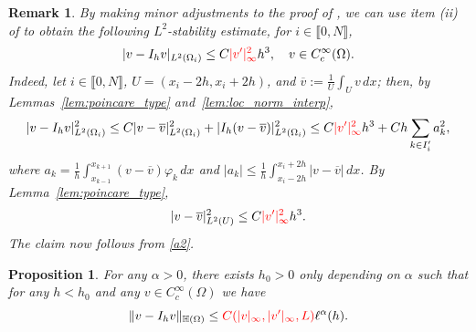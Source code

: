 \documentclass[10 pt]{article}
\newcommand\inter[1]{\llbracket #1\rrbracket}
\newtheorem{remark}[theorem]{Remark}
\newtheorem{proposition}[theorem]{Proposition}
\numberwithin{equation}{section}
\newcommand{\B}[1]{{\color{red} #1}}  %
\begin{document}
\begin{remark}\label{rem:l2_stability}
By making minor adjustments to the proof of  , we can use item (ii) of  to obtain the following $L^2$-stability estimate, for $i\in\inter{0,N}$,
%
\begin{equation*}
    |v-I_hv|_{L^2(\Omega_i)} \leq C\B{|v^\prime|^2_{\infty}} h^3, \quad  v\in C_c^\infty(\Omega).
\end{equation*}
Indeed, let $i\in\inter{0,N}$, $U=({x_i-2h},{x_{i}+2h})$, and $\overline{v}:=\frac{1}{U}\int_U v\, dx$; then, by Lemmas~\ref{lem:poincare_type} and~\ref{lem:loc_norm_interp},
\begin{align}
|v-I_hv|^2_{L^2(\Omega_i)}
\leq C|v-\overline{v}|_{L^2(\Omega_i)}^2 +|I_h(v-\overline{v})|^2_{L^2(\Omega_i)}
\leq C\B{|v^\prime|^2_{\infty}}h^3+Ch\sum_{k\in I_i^\prime}a_k^2,\label{a2}
\end{align}
where $a_k=\frac{1}{h}\int_{x_{k-1}}^{x_{k+1}} (v-\overline{v})\varphi_k\, dx$ and $|a_k|\leq \frac{1}{h}\int_{x_i-2h}^{x_{i}+2h}|v-\overline{v}|\, dx$. By Lemma~\ref{lem:poincare_type},
%
\begin{equation*}
    |v-\overline{v}|_{L^2(U)}^2\leq C\B{|v^\prime|^2_{\infty}}h^3.
\end{equation*}
%
The claim now follows from \eqref{a2}.
\end{remark}

\begin{proposition}\label{eq:estab_H_c_infty}
For any $\alpha>0$, there exists $h_0>0$ only depending on $\alpha$ such that for any $h<h_0$ and any $v\in C_c^\infty(\Omega)$ we have
%
\begin{equation}\label{eq:rate_H_c_infty}
    \|v-I_h v\|_{\mathbb H(\Omega)}\leq \B{C(|v|_{\infty},|v^\prime|_{\infty},L)}\ell^\alpha(h).
\end{equation}
%
\end{proposition}
\end{document}
